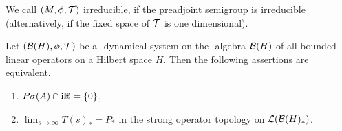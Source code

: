 We call $ (M,\phi,\mathcal{T}) $  irreducible, if the preadjoint semigroup is irreducible (alternatively, if the fixed space of $ \mathcal{T} $  is one dimensional).
\begin{proposition}\label{prop:d4-3.7}
Let $ (\mathcal{B}(H),\phi,\mathcal{T}) $  be a \WA-dynamical system on the \WA-algebra $ \mathcal{B}(H) $  of all bounded linear operators on a Hilbert space $ H $.
Then the following assertions are equivalent.
\begin{enumerate}[\upshape (a)]
\item
$ P\sigma(A) \cap \mathrm{i}\mathbb{R} = \{0\} $,

\item
$ \lim_{s \to \infty} T(s)_{*} = P_{*} $  in the strong operator topology on $ \mathcal{L}(\mathcal{B}(H)_{*}) $.
\end{enumerate}
\end{proposition}
